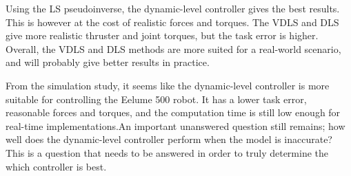 Using the LS pseudoinverse, the dynamic-level controller gives the best results.
This is however at the cost of realistic forces and torques. The VDLS and DLS
give more realistic thruster and joint torques, but the task error is higher. Overall,
the VDLS and DLS methods are more suited for a real-world scenario, and will
probably give better results in practice.

From the simulation study, it seems like the dynamic-level controller is more
suitable for controlling the Eelume 500 robot. It has a lower task error, reasonable
forces and torques, and the computation time is still low enough for real-time
implementations.An important unanswered question still remains; how well does the
dynamic-level controller perform when the model is inaccurate? This is a question
that needs to be answered in order to truly determine the which controller is best.
